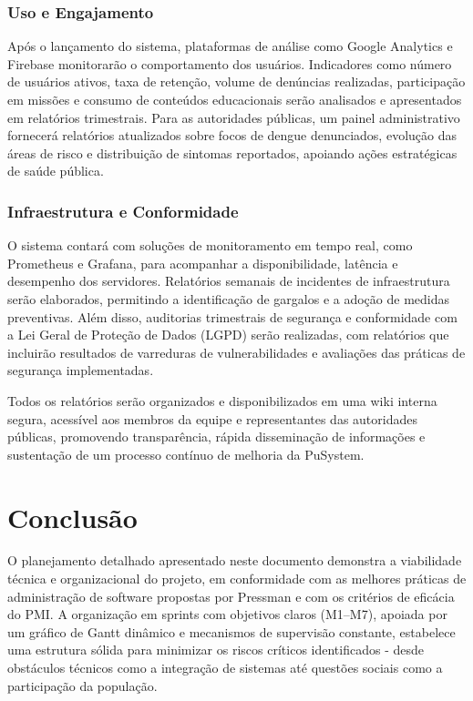 \documentclass[a5paper, 12pt]{article}
\begin{document}
\subsubsection{Uso e Engajamento}

Após o lançamento do sistema, plataformas de análise como Google Analytics e Firebase monitorarão o comportamento dos usuários. Indicadores como número de usuários ativos, taxa de retenção, volume de denúncias realizadas, participação em missões e consumo de conteúdos educacionais serão analisados e apresentados em relatórios trimestrais. Para as autoridades públicas, um painel administrativo fornecerá relatórios atualizados sobre focos de dengue denunciados, evolução das áreas de risco e distribuição de sintomas reportados, apoiando ações estratégicas de saúde pública.

\subsubsection{Infraestrutura e Conformidade}

O sistema contará com soluções de monitoramento em tempo real, como Prometheus e Grafana, para acompanhar a disponibilidade, latência e desempenho dos servidores. Relatórios semanais de incidentes de infraestrutura serão elaborados, permitindo a identificação de gargalos e a adoção de medidas preventivas. Além disso, auditorias trimestrais de segurança e conformidade com a Lei Geral de Proteção de Dados (LGPD) serão realizadas, com relatórios que incluirão resultados de varreduras de vulnerabilidades e avaliações das práticas de segurança implementadas.

Todos os relatórios serão organizados e disponibilizados em uma wiki interna segura, acessível aos membros da equipe e representantes das autoridades públicas, promovendo transparência, rápida disseminação de informações e sustentação de um processo contínuo de melhoria da PuSystem.

\newpage
\section{Conclusão}
O planejamento detalhado apresentado neste documento demonstra a viabilidade técnica e organizacional do projeto, em conformidade com as melhores práticas de administração de software propostas por Pressman e com os critérios de eficácia do PMI. A organização em sprints com objetivos claros (M1–M7), apoiada por um gráfico de Gantt dinâmico e mecanismos de supervisão constante, estabelece uma estrutura sólida para minimizar os riscos críticos identificados - desde obstáculos técnicos como a integração de sistemas até questões sociais como a participação da população.
\end{document}
